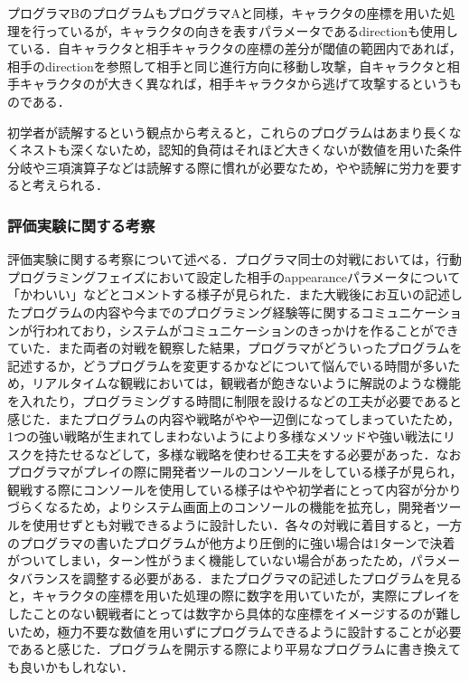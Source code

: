 プログラマBのプログラムもプログラマAと同様，キャラクタの座標を用いた処理を行っているが，キャラクタの向きを表すパラメータであるdirectionも使用している．自キャラクタと相手キャラクタの座標の差分が閾値の範囲内であれば，相手のdirectionを参照して相手と同じ進行方向に移動し攻撃，自キャラクタと相手キャラクタのが大きく異なれば，相手キャラクタから逃げて攻撃するというものである．

初学者が読解するという観点から考えると，これらのプログラムはあまり長くなくネストも深くないため，認知的負荷はそれほど大きくないが数値を用いた条件分岐や三項演算子などは読解する際に慣れが必要なため，やや読解に労力を要すると考えられる．




\subsubsection{評価実験に関する考察}

評価実験に関する考察について述べる．プログラマ同士の対戦においては，行動プログラミングフェイズにおいて設定した相手のappearanceパラメータについて「かわいい」などとコメントする様子が見られた．また大戦後にお互いの記述したプログラムの内容や今までのプログラミング経験等に関するコミュニケーションが行われており，システムがコミュニケーションのきっかけを作ることができていた．また両者の対戦を観察した結果，プログラマがどういったプログラムを記述するか，どうプログラムを変更するかなどについて悩んでいる時間が多いため，リアルタイムな観戦においては，観戦者が飽きないように解説のような機能を入れたり，プログラミングする時間に制限を設けるなどの工夫が必要であると感じた．またプログラムの内容や戦略がやや一辺倒になってしまっていたため，1つの強い戦略が生まれてしまわないようにより多様なメソッドや強い戦法にリスクを持たせるなどして，多様な戦略を使わせる工夫をする必要があった．なおプログラマがプレイの際に開発者ツールのコンソールをしている様子が見られ，観戦する際にコンソールを使用している様子はやや初学者にとって内容が分かりづらくなるため，よりシステム画面上のコンソールの機能を拡充し，開発者ツールを使用せずとも対戦できるように設計したい．各々の対戦に着目すると，一方のプログラマの書いたプログラムが他方より圧倒的に強い場合は1ターンで決着がついてしまい，ターン性がうまく機能していない場合があったため，パラメータバランスを調整する必要がある．またプログラマの記述したプログラムを見ると，キャラクタの座標を用いた処理の際に数字を用いていたが，実際にプレイをしたことのない観戦者にとっては数字から具体的な座標をイメージするのが難しいため，極力不要な数値を用いずにプログラムできるように設計することが必要であると感じた．プログラムを開示する際により平易なプログラムに書き換えても良いかもしれない．

